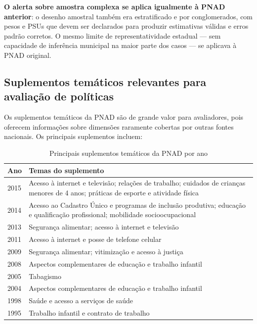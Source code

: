 \textbf{O alerta sobre amostra complexa se aplica igualmente à PNAD anterior}: o desenho amostral também era estratificado e por conglomerados, com pesos e PSUs que devem ser declarados para produzir estimativas válidas e erros padrão corretos. O mesmo limite de representatividade estadual --- sem capacidade de inferência municipal na maior parte dos casos --- se aplicava à PNAD original.

\subsection{Suplementos temáticos relevantes para avaliação de políticas}

Os suplementos temáticos da PNAD são de grande valor para avaliadores, pois oferecem informações sobre dimensões raramente cobertas por outras fontes nacionais. Os principais suplementos incluem:

\begin{table}[H]
\centering
\caption{Principais suplementos temáticos da PNAD por ano}
\label{tab:pnad_suplementos}
\begin{tabularx}{\textwidth}{@{} p{1.5cm} X @{}}
\toprule
\textbf{Ano} & \textbf{Temas do suplemento} \\
\midrule
2015 & Acesso à internet e televisão; relações de trabalho; cuidados de crianças menores de 4 anos; práticas de esporte e atividade física \\
2014 & Acesso ao Cadastro Único e programas de inclusão produtiva; educação e qualificação profissional; mobilidade socioocupacional \\
2013 & Segurança alimentar; acesso à internet e televisão \\
2011 & Acesso à internet e posse de telefone celular \\
2009 & Segurança alimentar; vitimização e acesso à justiça \\
2008 & Aspectos complementares de educação e trabalho infantil \\
2005 & Tabagismo \\
2004 & Aspectos complementares de educação e trabalho infantil \\
1998 & Saúde e acesso a serviços de saúde \\
1995 & Trabalho infantil e contrato de trabalho \\
\bottomrule
\end{tabularx}
\end{table}


